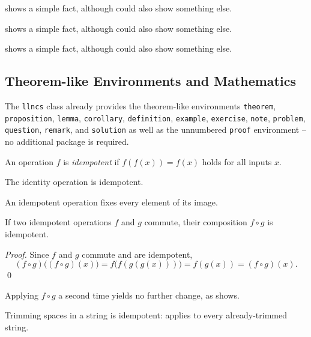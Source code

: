 \begin{ltgexample}
 shows a simple fact, although  could also show something else.

 shows a simple fact, although  could also show something else.

 shows a simple fact, although  could also show something else.
\end{ltgexample}

\subsection{Theorem-like Environments and Mathematics}

The \texttt{llncs} class already provides the theorem-like environments \texttt{theorem}, \texttt{proposition}, \texttt{lemma}, \texttt{corollary}, \texttt{definition}, \texttt{example}, \texttt{exercise}, \texttt{note}, \texttt{problem}, \texttt{question}, \texttt{remark}, and \texttt{solution} as well as the unnumbered \texttt{proof} environment -- no additional package is required.

\begin{ltgexample}
\begin{definition}[Idempotence]
  An operation $f$ is \emph{idempotent} if $f(f(x)) = f(x)$ holds for all inputs $x$.
\end{definition}

\begin{proposition}
  The identity operation is idempotent.
\end{proposition}

\begin{lemma}\label{lem:fixed}
  An idempotent operation fixes every element of its image.
\end{lemma}

\begin{theorem}\label{thm:idempotent-composition}
  If two idempotent operations $f$ and $g$ commute, their composition $f \circ g$ is idempotent.
\end{theorem}

\begin{proof}
  Since $f$ and $g$ commute and are idempotent,
  \begin{equation}
    (f \circ g)\bigl((f \circ g)(x)\bigr) = f\bigl(f(g(g(x)))\bigr) = f(g(x)) = (f \circ g)(x).
    \label{eq:idempotent-composition}
  \end{equation}
  \qed
\end{proof}

\begin{corollary}
  Applying $f \circ g$ a second time yields no further change, as  shows.
\end{corollary}

\begin{example}
  Trimming spaces in a string is idempotent:  applies to every already-trimmed string.
\end{example}
\end{ltgexample}

